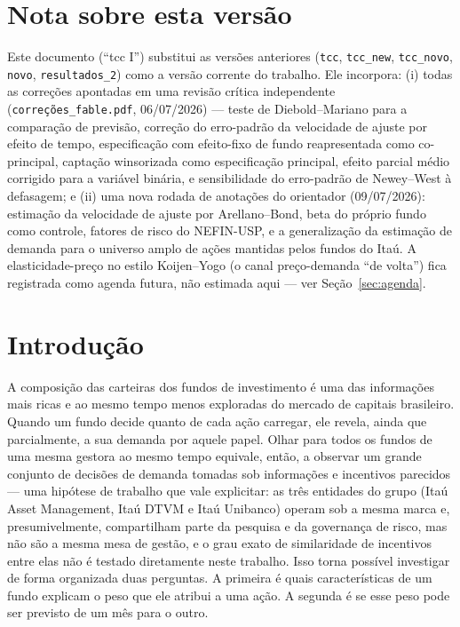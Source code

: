\documentclass[12pt,a4paper]{article}
\begin{document}
\section*{Nota sobre esta versão}
Este documento (``tcc I'') substitui as versões anteriores (\texttt{tcc}, \texttt{tcc\_new},
\texttt{tcc\_novo}, \texttt{novo}, \texttt{resultados\_2}) como a versão corrente do trabalho.
Ele incorpora: (i) todas as correções apontadas em uma revisão crítica independente
(\texttt{correções\_fable.pdf}, 06/07/2026) --- teste de Diebold--Mariano para a comparação de
previsão, correção do erro-padrão da velocidade de ajuste por efeito de tempo, especificação
com efeito-fixo de fundo reapresentada como co-principal, captação winsorizada como
especificação principal, efeito parcial médio corrigido para a variável binária, e sensibilidade
do erro-padrão de Newey--West à defasagem; e (ii) uma nova rodada de anotações do orientador
(09/07/2026): estimação da velocidade de ajuste por Arellano--Bond, beta do próprio fundo como
controle, fatores de risco do NEFIN-USP, e a generalização da estimação de demanda para o
universo amplo de ações mantidas pelos fundos do Itaú. A elasticidade-preço no estilo
Koijen--Yogo (o canal preço-demanda ``de volta'') fica registrada como agenda futura, não
estimada aqui --- ver Seção~\ref{sec:agenda}.

\section{Introdução}

A composição das carteiras dos fundos de investimento é uma das informações mais ricas e ao
mesmo tempo menos exploradas do mercado de capitais brasileiro. Quando um fundo decide quanto
de cada ação carregar, ele revela, ainda que parcialmente, a sua demanda por aquele papel.
Olhar para todos os fundos de uma mesma gestora ao mesmo tempo equivale, então, a observar um
grande conjunto de decisões de demanda tomadas sob informações e incentivos parecidos --- uma
hipótese de trabalho que vale explicitar: as três entidades do grupo (Itaú Asset Management,
Itaú DTVM e Itaú Unibanco) operam sob a mesma marca e, presumivelmente, compartilham parte da
pesquisa e da governança de risco, mas não são a mesma mesa de gestão, e o grau exato de
similaridade de incentivos entre elas não é testado diretamente neste trabalho. Isso torna
possível investigar de forma organizada duas perguntas. A primeira é quais características de
um fundo explicam o peso que ele atribui a uma ação. A segunda é se esse peso pode ser previsto
de um mês para o outro.
\end{document}
